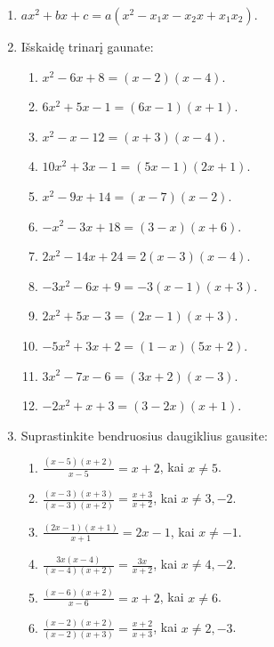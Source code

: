 \documentclass[11pt,a4paper]{scrartcl}
\begin{document}
\begin{enumerate}[label=\textbf{\arabic*.}, leftmargin=*]
\begin{enumerate}[label={(\arabic*)}]
        \item $(a-3)(2a+5)$.
        \item $(3m+1)(2m+3)$.
        \item $(y-4)(y-1)$.
        \item $(x-7)(x-2)$.
        \item $(b+c)(ab+c)$.
        \item $(x+3)(x^2+2)$.
        \item Iškelkite bendrąjį daugiklį, tada pritaikykite kvadratų skirtumo formulę: $$(x-1)(x^2-y^2)=(x-1)(x-y)(x+y)$$.
    \end{enumerate}
    \item $ax^2+bx+c=a(x^2-x_1x-x_2x+x_1x_2)$.
    \item Išskaidę trinarį gaunate:
    \begin{enumerate}[label={(\arabic*)}]
        \item $x^2-6x+8=(x-2)(x-4)$.
        \item $6x^2+5x-1=(6x-1)(x+1)$.
        \item $x^2-x-12=(x+3)(x-4)$.
        \item $10x^2+3x-1=(5x-1)(2x+1)$.
        \item $x^2-9x+14=(x-7)(x-2)$.
        \item $-x^2-3x+18=(3-x)(x+6)$.
        \item $2x^2-14x+24=2(x-3)(x-4)$.
        \item $-3x^2-6x+9=-3(x-1)(x+3)$.
        \item $2x^2+5x-3=(2x-1)(x+3)$.
        \item $-5x^2+3x+2=(1-x)(5x+2)$.
        \item $3x^2-7x-6=(3x+2)(x-3)$.
        \item $-2x^2+x+3=(3-2x)(x+1)$.
    \end{enumerate}
    \item Suprastinkite bendruosius daugiklius gausite:
    \begin{enumerate}[label={(\arabic*)}]
        \item $\frac{(x-5)(x+2)}{x-5}=x+2$, kai $x\ne5$.
        \item $\frac{(x-3)(x+3)}{(x-3)(x+2)}=\frac{x+3}{x+2}$, kai $x\ne3,-2$.
        \item $\frac{(2x-1)(x+1)}{x+1}=2x-1$, kai $x\ne-1$.
        \item $\frac{3x(x-4)}{(x-4)(x+2)}=\frac{3x}{x+2}$, kai $x\ne4,-2$.
        \item $\frac{(x-6)(x+2)}{x-6}=x+2$, kai $x\ne6$.
        \item $\frac{(x-2)(x+2)}{(x-2)(x+3)}=\frac{x+2}{x+3}$, kai $x\ne2,-3$.
    \end{enumerate}
\end{enumerate}
\end{document}
